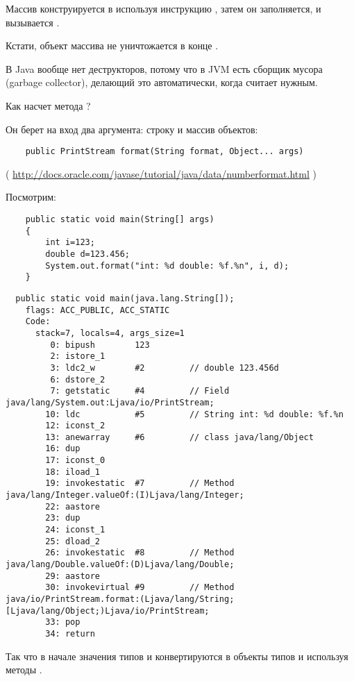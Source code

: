 Массив конструируется в \main используя инструкцию , 
затем он заполняется, и вызывается \ttf.


Кстати, объект массива не уничтожается в конце \main.

В Java вообще нет деструкторов, потому что в JVM есть сборщик мусора (garbage collector),
делающий это автоматически, когда считает нужным.


Как насчет метода ?

Он берет на вход два аргумента: строку и массив объектов:

\begin{lstlisting}
	public PrintStream format(String format, Object... args)
\end{lstlisting}
( \url{http://docs.oracle.com/javase/tutorial/java/data/numberformat.html} )

Посмотрим:

\begin{lstlisting}
	public static void main(String[] args)
	{
		int i=123;
		double d=123.456;
		System.out.format("int: %d double: %f.%n", i, d);
	}
\end{lstlisting}

\begin{lstlisting}
  public static void main(java.lang.String[]);
    flags: ACC_PUBLIC, ACC_STATIC
    Code:
      stack=7, locals=4, args_size=1
         0: bipush        123
         2: istore_1      
         3: ldc2_w        #2         // double 123.456d
         6: dstore_2      
         7: getstatic     #4         // Field java/lang/System.out:Ljava/io/PrintStream;
        10: ldc           #5         // String int: %d double: %f.%n
        12: iconst_2      
        13: anewarray     #6         // class java/lang/Object
        16: dup           
        17: iconst_0      
        18: iload_1       
        19: invokestatic  #7         // Method java/lang/Integer.valueOf:(I)Ljava/lang/Integer;
        22: aastore       
        23: dup           
        24: iconst_1      
        25: dload_2       
        26: invokestatic  #8         // Method java/lang/Double.valueOf:(D)Ljava/lang/Double;
        29: aastore       
        30: invokevirtual #9         // Method java/io/PrintStream.format:(Ljava/lang/String;[Ljava/lang/Object;)Ljava/io/PrintStream;
        33: pop           
        34: return        
\end{lstlisting}


Так что в начале значения типов  и  конвертируются в объекты типов 
 и  используя методы .

